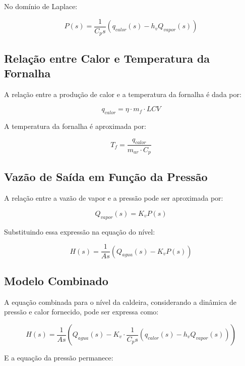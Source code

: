 \documentclass{article}
\begin{document}
No domínio de Laplace:

\begin{equation}
    P(s) = \frac{1}{C_p s} (q_{calor}(s) - h_v Q_{vapor}(s))
\end{equation}

\subsection{Rela\c{c}\~ao entre Calor e Temperatura da Fornalha}
A relação entre a produção de calor e a temperatura da fornalha é dada por:

\begin{equation}
    q_{calor} = \eta \cdot m_f \cdot LCV
\end{equation}

A temperatura da fornalha é aproximada por:

\begin{equation}
    T_f = \frac{q_{calor}}{m_{ar} \cdot C_p}
\end{equation}

\subsection{Vaz\~ao de Sa\'ida em Fun\c{c}\~ao da Press\~ao}
A relação entre a vazão de vapor e a pressão pode ser aproximada por:

\begin{equation}
    Q_{vapor}(s) = K_v P(s)
\end{equation}

Substituindo essa expressão na equação do nível:

\begin{equation}
    H(s) = \frac{1}{A s} \left( Q_{agua}(s) - K_v P(s) \right)
\end{equation}

\subsection{Modelo Combinado}
A equação combinada para o nível da caldeira, considerando a dinâmica de pressão e calor fornecido, pode ser expressa como:

\begin{equation}
    H(s) = \frac{1}{A s} \left( Q_{agua}(s) - K_v \cdot \frac{1}{C_p s} (q_{calor}(s) - h_v Q_{vapor}(s)) \right)
\end{equation}

E a equação da pressão permanece:
\end{document}
